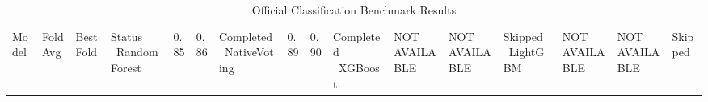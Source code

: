 \begin{table}[]
\centering
\begin{tabular}{l l l l}
Model & Fold Avg & Best Fold & Status \
RandomForest & 0.85 & 0.86 & Completed \
NativeVoting & 0.89 & 0.90 & Completed \
XGBoost & NOT AVAILABLE & NOT AVAILABLE & Skipped \
LightGBM & NOT AVAILABLE & NOT AVAILABLE & Skipped \
\end{tabular}
\caption{Official Classification Benchmark Results}
\end{table}